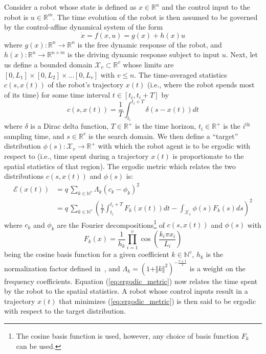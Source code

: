 \documentclass[conference]{IEEEtran}
\begin{document}
Consider a robot whose state is defined as $x \in \mathbb{R}^n$ and the control input to the robot is $u \in \mathbb{R}^m$.
The time evolution of the robot is then assumed to be governed by the control-affine dynamical system of the form
\begin{equation} \label{eq:robot_dynamics}
\dot{x} = f(x,u) = g(x) + h(x) u
\end{equation}
where $g(x) : \mathbb{R}^n \to \mathbb{R}^n$ is the free dynamic response of the robot, and $h(x): \mathbb{R}^n \to \mathbb{R}^{n \times m}$ is the driving dynamic response subject to input $u$.
Next, let us define a bounded domain $\mathcal{X}_v \subset \mathbb{R}^v$  whose limits are $\left[0,L_1 \right] \times \left[ 0,L_2 \right] \times \ldots \left[ 0, L_v\right]$ with $v\le n$. 
The time-averaged statistics $c(s, x(t))$ of the robot's trajectory $x(t)$ (i.e., where the robot spends most of its time) for some time interval $t \in \left[ t_i, t_i + T\right]$ by
\begin{equation}
c(s, x(t)) = \frac{1}{T}\int_{t_i}^{t_i+T} \delta (s - x(t)) dt
\end{equation}
where $\delta$ is a Dirac delta function, $T \in \mathbb{R}^+$ is the time horizon, $t_i \in \mathbb{R}^+$ is the $i^\text{th}$ sampling time, and $s \in \mathbb{R}^v$ is the search domain.
We then define a ``target'' distribution $\phi(s) : \mathcal{X}_v \to \mathbb{R}^+$ with which the robot agent is to be ergodic with respect to (i.e., time spent during a trajectory $x(t)$ is proportionate to the spatial statistics of that region).
The ergodic metric which relates the two distributions $c(s,x(t))$ and $\phi(s)$ is:
\begin{align} \label{eq:ergodic_metric}
\mathcal{E}(x(t)) & = q \,\sum_{k \in \mathbb{N}^v} \Lambda_k \left(c_k -\phi_k \right)^2   \\
& = q \, \sum_{k \in \mathbb{N}^v} \left( \frac{1}{T} \int_{t_i}^{t_i + T} F_k(x(t)) dt - \int_{\mathcal{X}_v} \phi(s) F_k(s) ds \right)^2 \nonumber
\end{align}
where $c_k$ and $\phi_k$ are the Fourier decompositions\footnote{The cosine basis function is used, however, any choice of basis function $F_k$ can be used.} of $c(s,x(t))$ and $\phi(s)$ with
\begin{equation*}
F_k(x) = \frac{1}{h_k}\prod_{i=1}^v \cos \left( \frac{k_i \pi x_i}{L_i} \right)
\end{equation*}
being the cosine basis function for a given coefficient $k \in \mathbb{N}^v$,  $h_k$ is the normalization factor defined in~\cite{mathew2011metrics}, and $\Lambda_k = (1 + \Vert k \Vert^2)^{-\frac{v+1}{2}}$ is a weight on the frequency coefficients.
Equation (\ref{eq:ergodic_metric}) now relates the time spent by the robot to the spatial statistics.
A robot whose control inputs result in a trajectory $x(t)$ that minimizes (\ref{eq:ergodic_metric}) is then said to be ergodic with respect to the target distribution.
\end{document}
